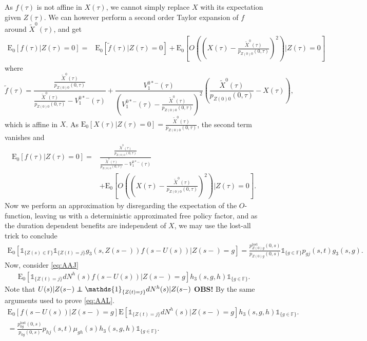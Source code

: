 \documentclass[12pt]{article}
\newcommand{\E}{\text{E}}
\newcommand{\indic}[1]{\mathds{1}_{ \{ #1 \} }}
\newcommand\independent{\protect\mathpalette{\protect\independenT}{\perp}}
\def\independenT#1#2{\mathrel{\rlap{$#1#2$}\mkern2mu{#1#2}}}
\theoremstyle{my_thm}
\begin{document}
As $f(\tau)$ is not affine in $X(\tau)$, we cannot simply replace $X$ with its expectation given $Z(\tau)$. We can however perform a second order Taylor expansion of $f$ around $\tilde{X}^0(\tau)$, and get
\begin{align*}
\E_0[f(\tau) |Z(\tau)=0]
=&
\E_0[\tilde{f}(\tau) |Z(\tau)=0]+ 
\E_0 \left[ O \left( \left( X(\tau)-\frac{\tilde{X}^0(\tau)}{p_{Z(0)0}(0,\tau)} \right) ^2 \right) \bigg| Z(\tau)=0 \right]
\end{align*}
where 
$$
\tilde{f}(\tau)=
\frac{
	\frac{\tilde{X}^0(\tau)}{p_{Z(0)0}(0,\tau)}
}{
	\frac{\tilde{X}^0(\tau)}{p_{Z(0)0}(0,\tau)}
	-V_1^{0*-}(\tau)
}
+
\frac{
	V_1^{0*-}(\tau)
	}{
	\left( V_1^{0*-}(\tau)-
	\frac{\tilde{X}^0(\tau)}{p_{Z(0)0}(0,\tau)}
	\right)^2
}
\left( \frac{\tilde{X}^0(\tau)}{p_{Z(0)0}(0,\tau)}-X(\tau)\right),
$$
which is affine in $X$. As $\E_0[X(\tau)|Z(\tau)=0]=\frac{\tilde{X}^0(\tau)}{p_{Z(0)0}(0,\tau)}$, the second term vanishes and
\begin{align*}
\E_0[f(\tau) |Z(\tau)=0]
=&
\frac{
	\frac{\tilde{X}^0(\tau)}{p_{Z(0)0}(0,\tau)}
}{
	\frac{\tilde{X}^0(\tau)}{p_{Z(0)0}(0,\tau)}
	-V_1^{0*-}(\tau)
}
\\
&+
\E_0 \left[ O \left( \left( X(\tau)-\frac{\tilde{X}^0(\tau)}{p_{Z(0)0}(0,\tau)} \right) ^2 \right) \bigg| Z(\tau)=0 \right].
\end{align*}
Now we perform an approximation by disregarding the expectation of the $O$-function, leaving us with a deterministic approximated free policy factor, and as the duration dependent benefits are independent of $X$, we may use the lost-all trick to conclude
\begin{align*}
\E_0 [ \indic{Z(s) \in \mathbb{F}} \indic{Z(t)=j} g_3(s,Z(s-)) f(s-U(s))|Z(s-)=g]
=
\frac{p^{\text{lost}}_{Z(0)g}(0,s)}{p_{Z(0)g}(0,s)} \indic{g \in \mathbb{F}} p_{gj}(s,t)g_3(s,g).
\end{align*}
Now, consider \eqref{eq:AAJ}
\begin{align*}
\E_0 [  \indic{Z(t)=j}  dN^h(s) f(s-U(s))|Z(s-)=g] h_3(s,g,h) \indic{g \in \mathbb{F}}.
\end{align*}
Note that $U(s)|Z(s-) \independent \indic{Z(t)=j}dN^h(s)|Z(s-)$ \textbf{OBS!} By the same arguments used to prove \eqref{eq:AAL}.
\begin{align*}
\E_0[f(s-U(s))|Z(s-)=g] \E[ \indic{Z(t)=j}dN^h(s) |Z(s-)=g] h_3(s,g,h) \indic{g \in \mathbb{F}}.
\\
=\frac{p_{0g}^\text{lost}(0,s)}{p_{0g}(0,s)} p_{hj}(s,t) \mu_{gh}(s) h_3(s,g,h) \indic{g \in \mathbb{F}}.
\end{align*}
\end{document}
